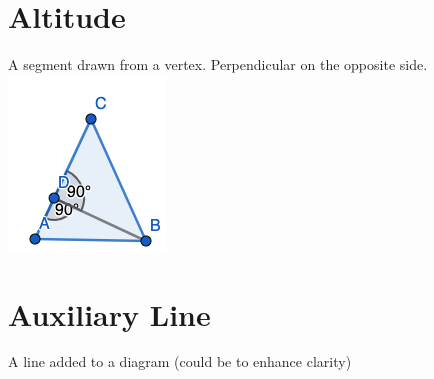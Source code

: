 \documentclass{article}
\begin{document}
	
	\section{Altitude}
	A segment drawn from a vertex. Perpendicular on the opposite side.
	\newline
	\includegraphics[scale=0.45]{pics/altitude.png}
	
	
	\section{Auxiliary Line}
	A line added to a diagram (could be to enhance clarity)
\end{document}
